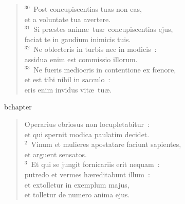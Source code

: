\begin{verse}${}^{30}$~Post concupiscentias tuas non eas,\\ et a voluntate tua avertere.\\
${}^{31}$~Si pr\ae stes anim\ae\ tu\ae\ concupiscentias ejus,\\ faciat te in gaudium inimicis tuis.\\
${}^{32}$~Ne oblecteris in turbis nec in modicis~:\\ assidua enim est commissio illorum.\\
${}^{33}$~Ne fueris mediocris in contentione ex fœnore,\\ et est tibi nihil in sacculo~:\\ eris enim invidus vit\ae\ tu\ae .\end{verse}


bchapter\begin{verse}\vspace{-19pt}Operarius ebriosus non locupletabitur~:\\ et qui spernit modica paulatim decidet.\\
${}^{2}$~Vinum et mulieres apostatare faciunt sapientes,\\ et arguent sensatos.\\
${}^{3}$~Et qui se jungit fornicariis erit nequam~:\\ putredo et vermes h\ae reditabunt illum~:\\ et extolletur in exemplum majus,\\ et tolletur de numero anima ejus.\end{verse}


